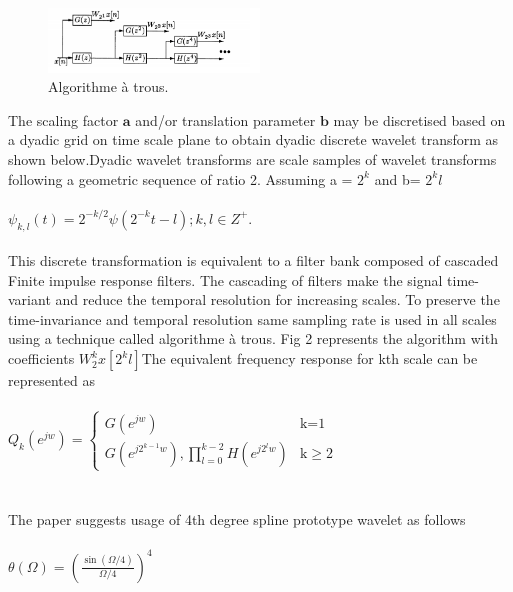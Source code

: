 \documentclass[twocolumn,showpacs,%
  nofootinbib,aps,superscriptaddress,%
  eqsecnum,prd,notitlepage,showkeys,10pt]{revtex4-1}
\begin{document}
\begin{figure}
\includegraphics[width=0.5\textwidth]{fig2.png}
\caption{\label{fig:fig2}Algorithme \`a  trous.  }
\end{figure}
The scaling factor \(\mathbf{a} \)  and/or translation parameter \( \mathbf{b} \) may be discretised based on a dyadic grid on time scale plane to obtain dyadic discrete wavelet transform as shown below.Dyadic wavelet transforms are scale samples of wavelet transforms following a geometric sequence of ratio 2. Assuming a = \(2^k\) and b= \(2^k l \) \\ \\
\begin{math}
\psi_{k,l}(t) = 2^{-k/2} \psi \left (  2^{-k} t-l\right ); k, l \in Z^+.
\end{math} \\ \\
This discrete transformation is equivalent to a filter bank composed of cascaded Finite impulse response filters. The cascading of filters make the signal time-variant and reduce the temporal resolution for increasing scales. To preserve the time-invariance and temporal resolution same sampling rate is used in all scales using a technique called algorithme \`a  trous. Fig 2 represents the algorithm with coefficients \( W_2^{k}x[2^kl] \)The equivalent frequency response for kth scale can be represented as 
\\ 
\\
\begin{math}
Q_k \left ( e ^ {jw} \right ) = \begin{cases} G (e^{jw}) & \text{k=1} \\ G(e^{j2^{k-1}w} ) , \prod_{l=0}^{k-2}H(e^{j2^lw}) & \text{k} \geq 2 \end{cases}
\end{math}
\\
\\ \\
The paper suggests usage of 4th degree spline prototype wavelet as follows
\\ \\
\begin{math}
\theta (\Omega) =  \left ( \frac{\sin(\Omega/4)}{\Omega/4} \right ) ^ 4
\end{math}
\end{document}
